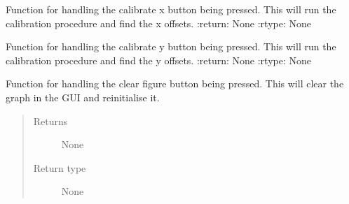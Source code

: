 \documentclass[letterpaper,10pt,english]{sphinxmanual}
\begin{document}
\begin{fulllineitems}
\begin{fulllineitems}
\end{fulllineitems}


\begin{fulllineitems}
\label{\detokenize{index:app.MainWindow.calibrate_x}}
\sphinxAtStartPar
Function for handling the calibrate x button being pressed. This will run the calibration procedure and find the x offsets.
:return: None
:rtype: None

\end{fulllineitems}


\begin{fulllineitems}
\label{\detokenize{index:app.MainWindow.calibrate_y}}
\sphinxAtStartPar
Function for handling the calibrate y button being pressed. This will run the calibration procedure and find the y offsets.
:return: None
:rtype: None

\end{fulllineitems}


\begin{fulllineitems}
\label{\detokenize{index:app.MainWindow.clear_figure}}
\sphinxAtStartPar
Function for handling the clear figure button being pressed. This will clear the graph in the GUI and reinitialise it.
\begin{quote}\begin{description}
\item[{Returns}] \leavevmode
\sphinxAtStartPar
None

\item[{Return type}] \leavevmode
\sphinxAtStartPar
None

\end{description}\end{quote}

\end{fulllineitems}



\end{fulllineitems}
\end{document}
